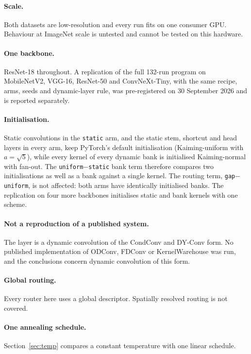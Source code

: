 \documentclass[10pt,a4paper]{article}
\begin{document}
\paragraph{Scale.} Both datasets are low-resolution and every run fits on
one consumer GPU. Behaviour at ImageNet scale is untested and cannot be
tested on this hardware.

\paragraph{One backbone.} ResNet-18 throughout. A replication of the
full 132-run program on MobileNetV2, VGG-16, ResNet-50 and
ConvNeXt-Tiny, with the same recipe, arms, seeds and dynamic-layer rule,
was pre-registered on 30 September 2026 and is reported separately.

\paragraph{Initialisation.} Static convolutions in the \texttt{static}
arm, and the static stem, shortcut and head layers in every arm, keep
PyTorch's default initialisation (Kaiming-uniform with $a=\sqrt5$), while
every kernel of every dynamic bank is initialised Kaiming-normal with
fan-out. The \texttt{uniform}$-$\texttt{static} bank term therefore
compares two initialisations as well as a bank against a single kernel.
The routing term, \texttt{gap}$-$\texttt{uniform}, is not affected: both
arms have identically initialised banks. The replication on four more
backbones initialises static and bank kernels with one scheme.

\paragraph{Not a reproduction of a published system.} The layer is a
dynamic convolution of the CondConv and DY-Conv form. No published
implementation of ODConv, FDConv or KernelWarehouse was run, and the
conclusions concern dynamic convolution of this form.

\paragraph{Global routing.} Every router here uses a global descriptor.
Spatially resolved routing is not covered.

\paragraph{One annealing schedule.} Section~\ref{sec:temp} compares a
constant temperature with one linear schedule.
\end{document}
